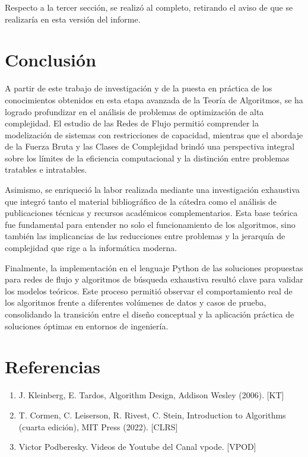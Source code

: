 \documentclass[12pt]{article}
\begin{document}
        Respecto a la tercer sección, se realizó al completo, retirando el aviso de que se realizaría en esta versión del informe.

\section{Conclusión}

    A partir de este trabajo de investigación y de la puesta en práctica de los conocimientos obtenidos en esta etapa avanzada de la Teoría de Algoritmos, se ha logrado profundizar en el análisis de problemas de optimización de alta complejidad. El estudio de las Redes de Flujo permitió comprender la modelización de sistemas con restricciones de capacidad, mientras que el abordaje de la Fuerza Bruta y las Clases de Complejidad brindó una perspectiva integral sobre los límites de la eficiencia computacional y la distinción entre problemas tratables e intratables.

    Asimismo, se enriqueció la labor realizada mediante una investigación exhaustiva que integró tanto el material bibliográfico de la cátedra como el análisis de publicaciones técnicas y recursos académicos complementarios. Esta base teórica fue fundamental para entender no solo el funcionamiento de los algoritmos, sino también las implicancias de las reducciones entre problemas y la jerarquía de complejidad que rige a la informática moderna.

    Finalmente, la implementación en el lenguaje Python de las soluciones propuestas para redes de flujo y algoritmos de búsqueda exhaustiva resultó clave para validar los modelos teóricos. Este proceso permitió observar el comportamiento real de los algoritmos frente a diferentes volúmenes de datos y casos de prueba, consolidando la transición entre el diseño conceptual y la aplicación práctica de soluciones óptimas en entornos de ingeniería.

\section{Referencias}

    \begin{enumerate}
        \item J. Kleinberg, E. Tardos, Algorithm Design, Addison Wesley (2006). [KT]
        \item T. Cormen, C. Leiserson, R. Rivest, C. Stein, Introduction to Algorithms (cuarta edición), MIT Press (2022). [CLRS]
        \item Victor Podberesky. Videos de Youtube del Canal vpode. [VPOD]
    \end{enumerate}
\end{document}
